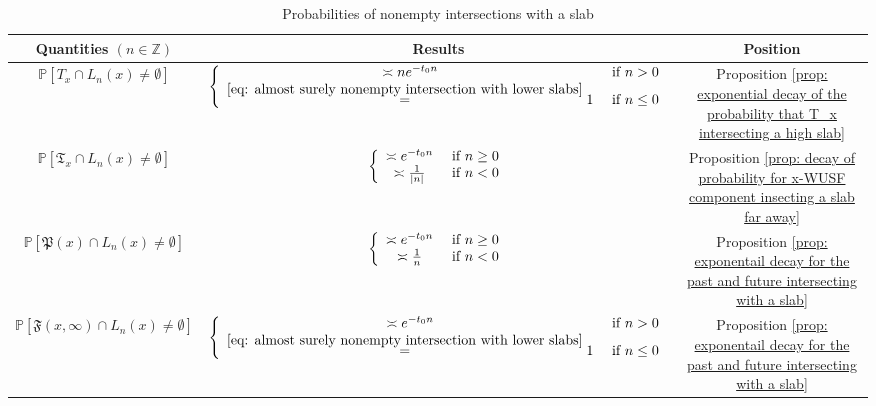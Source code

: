 \documentclass[12pt]{article}
\numberwithin{equation}{section}
\newcommand{\1}{\mathbf{1}}
\begin{document}
  \begin{table}[ht]
 	\centering
 	\begin{tabular}{|c|c|c|}
 		\hline
 		Quantities $(n\in\mathbb{Z})$ & Results & Position\\
 		\hline
 		$\mathbb{P}[T_x\cap L_n(x)\neq \emptyset]$ & $\left\{
 		\begin{array}{cc}
 		\asymp ne^{-t_0n} & \textnormal{ if }n>0\\
 		\stackrel{\eqref{eq: almost surely nonempty intersection with lower slabs}}{=}1& \textnormal{ if }n\leq 0\\
 		\end{array}
 		\right.$ & Proposition \ref{prop: exponential decay of the probability that T_x intersecting a high slab}\\
 			\hline
 		$\mathbb{P}[\mathfrak{T}_x\cap L_{n}(x)\neq\emptyset]$ & $\left\{
 		\begin{array}{cc}
 		\asymp e^{-t_0n} & \textnormal{ if }n\geq0\\
 		\asymp \frac{1}{|n|}& \textnormal{ if }n<0\\
 		\end{array}
 		\right.$ & Proposition \ref{prop: decay of probability for x-WUSF component insecting a slab far away}\\
 		\hline
 		$\mathbb{P}[\mathfrak{P}(x)\cap L_n(x)\neq\emptyset]$ &  $\left\{
 		\begin{array}{cc}
 		\asymp e^{-t_0n} & \textnormal{ if }n\geq0\\
 		\asymp \frac{1}{n}& \textnormal{ if }n<0\\
 		\end{array}
 		\right.$ & Proposition \ref{prop: exponentail decay for the past and future intersecting with a slab} \\
 		\hline
 		$\mathbb{P}[\mathfrak{F}(x,\infty)\cap L_{n}(x)\neq\emptyset]$ &  $\left\{
 		\begin{array}{cc}
 		\asymp e^{-t_0n} & \textnormal{ if }n>0\\
 		\stackrel{\eqref{eq: almost surely nonempty intersection with lower slabs}}{=}1& \textnormal{ if }n\leq 0\\
 		\end{array}
 		\right.$& Proposition \ref{prop: exponentail decay for the past and future intersecting with a slab}\\
 		\hline
 	\end{tabular}
 \centering
 	\caption{Probabilities of nonempty intersections with a slab}
 	\label{table: probability of nonempty intersections}
 \end{table}
 
\end{document}
